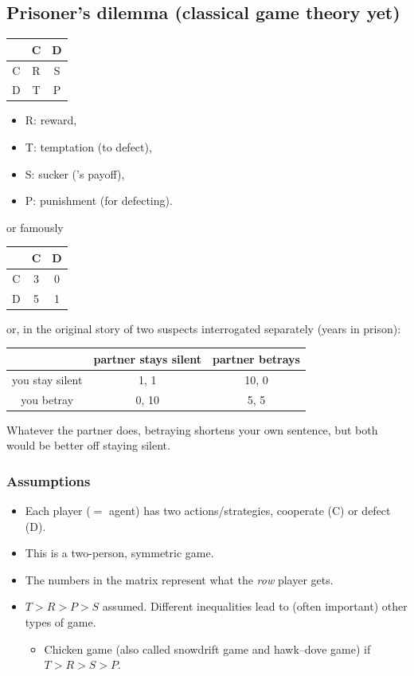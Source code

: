 \documentclass[20pt]{extarticle}
\newcommand{\pdmatrix}[4]{%
\begin{center}
\begin{tabular}{|c||c|c|}
\hline
 & C & D \\
\hline\hline
C & #1 & #2 \\
\hline
D & #3 & #4 \\
\hline
\end{tabular}
\end{center}
}
\begin{document}
\subsection*{Prisoner's dilemma (classical game theory yet)}

\pdmatrix{R}{S}{T}{P}
\begin{itemize}
\item R: reward,
\item T: temptation (to defect),
\item S: sucker ('s payoff),
\item P: punishment (for defecting).
\end{itemize}
or famously
\pdmatrix{3}{0}{5}{1}
or, in the original story of two suspects interrogated separately (years in prison):
\begin{center}
\renewcommand{\arraystretch}{1.4}
\begin{tabular}{|c||c|c|}
\hline
 & partner stays silent & partner betrays \\
\hline\hline
you stay silent & \cellcolor{stayc!50}1, 1 & \cellcolor{black!10}10, 0 \\
\hline
you betray & \cellcolor{black!10}0, 10 & \cellcolor{shiftc!60}5, 5 \\
\hline
\end{tabular}
\end{center}
Whatever the partner does, betraying shortens your own sentence, but both would be better off staying silent.

\subsubsection*{Assumptions}

\begin{itemize}
\item Each player ($=$ agent) has two actions/strategies, cooperate (C) or defect (D).
\item This is a two-person, symmetric game.
\item The numbers in the matrix represent what the \emph{row} player gets.
\item $T>R>P>S$ assumed. Different inequalities lead to (often important) other types of game.
	\begin{itemize}
	\item Chicken game (also called snowdrift game and hawk--dove game) if $T>R>S>P$.
	\end{itemize}
\end{itemize}
\end{document}
